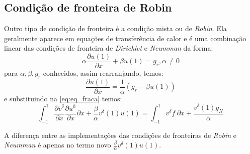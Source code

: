 \subsection{Condição de fronteira de Robin}
 Outro tipo de condição de fronteira é a condição mista ou de \emph{Robin}. Ela geralmente aparece em equações de transferência de calor e é uma combinação linear das condições de fronteira de \emph{Dirichlet} e \emph{Neumman} da forma:
 \begin{equation}
 \alpha \frac{\partial u(1)}{\partial x} + \beta u(1) = g_r , \alpha \neq 0 
 \end{equation}
 para $\alpha,\beta,g_r$ conhecidos, assim rearranjando, temos:
 \begin{equation}
 \frac{\partial u(1)}{\partial x}  =\frac{1}{\alpha}(g_r - \beta u(1))
 \end{equation}
e substituindo na \ref{eq:eq_fraca} temos:
\begin{equation}
\int^{1}_{-1} \frac{\partial v^\delta}{\partial x}  \frac{\partial u^h}{\partial x}  \partial x + \frac{\beta}{\alpha}v^\delta(1)u(1) =   \int^{1}_{-1}  v^\delta f\ \partial x + \frac{v^\delta(1)g_N}{\alpha}
\end{equation}

 A diferença entre as implementações das condições de fronteiras de \emph{Robin} e \emph{Neumman} é apenas no termo novo $\frac{\beta}{\alpha}v^\delta(1)u(1)$.
